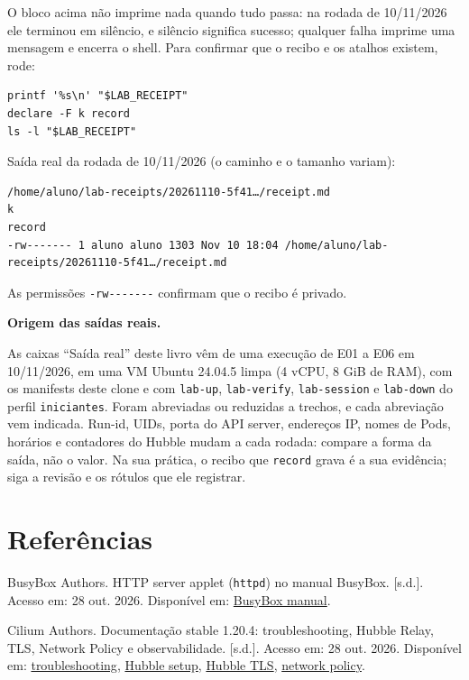 \documentclass[12pt,openany,oneside,a4paper,chapter=TITLE,english,brazil]{abntex2}
\newenvironment{referenciasabnt}
  {\begin{flushleft}\SingleSpacing\setlength{\parindent}{0pt}\setlength{\parskip}{\baselineskip}}
  {\end{flushleft}}
\begin{document}
\begin{apendicesenv}
O bloco acima não imprime nada quando tudo passa: na rodada de 10/11/2026 ele terminou em silêncio, e silêncio significa sucesso; qualquer falha imprime uma mensagem e encerra o shell. Para confirmar que o recibo e os atalhos existem, rode:

\begin{verbatim}
printf '%s\n' "$LAB_RECEIPT"
declare -F k record
ls -l "$LAB_RECEIPT"
\end{verbatim}

Saída real da rodada de 10/11/2026 (o caminho e o tamanho variam):

\begin{verbatim}
/home/aluno/lab-receipts/20261110-5f41…/receipt.md
k
record
-rw------- 1 aluno aluno 1303 Nov 10 18:04 /home/aluno/lab-receipts/20261110-5f41…/receipt.md
\end{verbatim}

As permissões \texttt{-{}\allowbreak{}rw-{}\allowbreak{}-{}\allowbreak{}-{}\allowbreak{}-{}\allowbreak{}-{}\allowbreak{}-{}\allowbreak{}-{}\allowbreak{}} confirmam que o recibo é privado.

\textbf{Origem das saídas reais.}

As caixas ``Saída real'' deste livro vêm de uma execução de E01 a E06 em 10/11/2026, em uma VM Ubuntu 24.04.5 limpa (4 vCPU, 8 GiB de RAM), com os manifests deste clone e com \texttt{lab-{}\allowbreak{}up}, \texttt{lab-{}\allowbreak{}verify}, \texttt{lab-{}\allowbreak{}session} e \texttt{lab-{}\allowbreak{}down} do perfil \texttt{iniciantes}. Foram abreviadas ou reduzidas a trechos, e cada abreviação vem indicada. Run-id, UIDs, porta do API server, endereços IP, nomes de Pods, horários e contadores do Hubble mudam a cada rodada: compare a forma da saída, não o valor. Na sua prática, o recibo que \texttt{record} grava é a sua evidência; siga a revisão e os rótulos que ele registrar.

\postextual
\chapter*{Referências}
\begin{referenciasabnt}

BusyBox Authors. HTTP server applet (\texttt{httpd}) no manual BusyBox. {[}s.d.{]}. Acesso em: 28 out. 2026. Disponível em: \href{https://busybox.net/BusyBox.html}{BusyBox manual}.

Cilium Authors. Documentação stable 1.20.4: troubleshooting, Hubble Relay, TLS, Network Policy e observabilidade. {[}s.d.{]}. Acesso em: 28 out. 2026. Disponível em: \href{https://docs.cilium.io/en/stable/operations/troubleshooting/}{troubleshooting}, \href{https://docs.cilium.io/en/stable/observability/hubble/setup/}{Hubble setup}, \href{https://docs.cilium.io/en/stable/observability/hubble/configuration/tls/}{Hubble TLS}, \href{https://docs.cilium.io/en/stable/security/policy/}{network policy}.


\end{referenciasabnt}
\end{apendicesenv}
\end{document}
